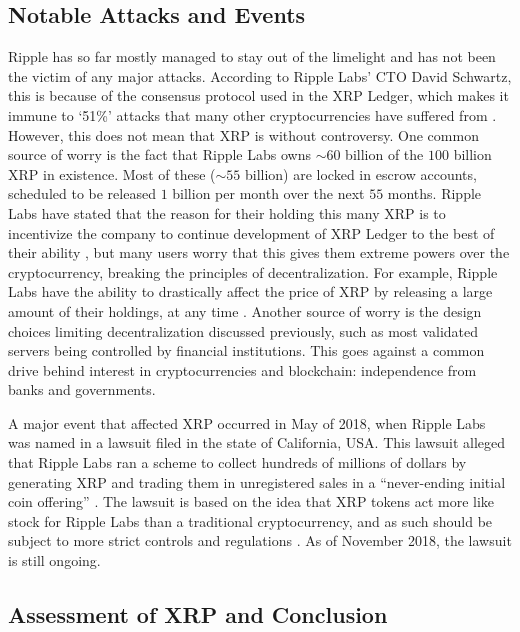 \documentclass[11pt,a4paper]{article}
\begin{document}
	\subsection{Notable Attacks and Events}
	
	Ripple has so far mostly managed to stay out of the limelight and has not been the victim of any major attacks. According to Ripple Labs' CTO David Schwartz, this is because of the consensus protocol used in the XRP Ledger, which makes it immune to `51\%' attacks that many other cryptocurrencies have suffered from \cite{newsbtc}. However, this does not mean that XRP is without controversy. One common source of worry is the fact that Ripple Labs owns $\sim60$ billion of the $100$ billion XRP in existence. Most of these ($\sim55$ billion) are locked in escrow accounts, scheduled to be released $1$ billion per month over the next $55$ months. Ripple Labs have stated that the reason for their holding this many XRP is to incentivize the company to continue development of XRP Ledger to the best of their ability \cite{technicalFAQ}, but many users worry that this gives them extreme powers over the cryptocurrency, breaking the principles of decentralization. For example, Ripple Labs have the ability to drastically affect the price of XRP by releasing a large amount of their holdings, at any time \cite{investinblockchain}. Another source of worry is the design choices limiting decentralization discussed previously, such as most validated servers being controlled by financial institutions. This goes against a common drive behind interest in cryptocurrencies and blockchain: independence from banks and governments.
	
	A major event that affected XRP occurred in May of 2018, when Ripple Labs was named in a lawsuit filed in the state of California, USA. This lawsuit alleged that Ripple Labs ran a scheme to collect hundreds of millions of dollars by generating XRP and trading them in unregistered sales in a ``never-ending initial coin offering'' \cite{bloomberg}. The lawsuit is based on the idea that XRP tokens act more like stock for Ripple Labs than a traditional cryptocurrency, and as such should be subject to more strict controls and regulations \cite{blockexplorer}. As of November 2018, the lawsuit is still ongoing.
	
	\subsection{Assessment of XRP and Conclusion}
	
\end{document}
